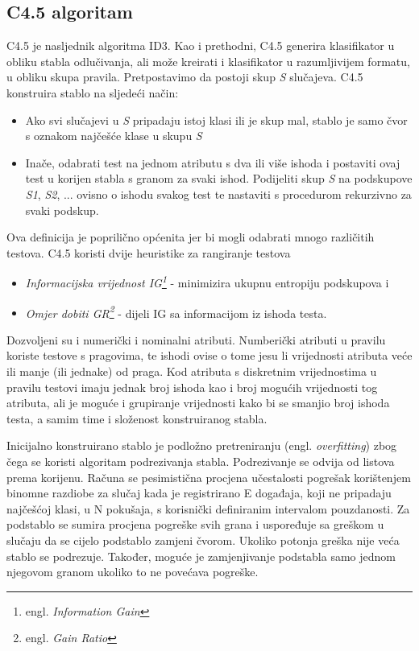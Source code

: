 \subsection{C4.5 algoritam}

C4.5 je nasljednik algoritma ID3. Kao i prethodni, C4.5 generira klasifikator u obliku stabla odlučivanja, ali može 
kreirati i klasifikator u razumljivijem formatu, u obliku skupa pravila. Pretpostavimo da postoji skup \textit{S} 
slučajeva. C4.5 konstruira stablo na sljedeći način:
\begin{itemize}
   \item Ako svi slučajevi u \textit{S} pripadaju istoj klasi ili je skup mal, stablo je samo čvor s oznakom najčešće klase u skupu \textit{S}
   \item Inače, odabrati test na jednom atributu s dva ili više ishoda i postaviti ovaj test u korijen stabla s granom za svaki ishod. Podijeliti skup \textit{S} na podskupove \textit{S1}, \textit{S2}, ... ovisno o ishodu svakog test te nastaviti s procedurom rekurzivno za svaki podskup.
\end{itemize}
Ova definicija je poprilično općenita jer bi mogli odabrati mnogo različitih testova. C4.5 koristi dvije heuristike za rangiranje testova
\begin{itemize}
   \item \textit{Informacijska vrijednost IG\footnote{engl. \textit{Information Gain}}}  - minimizira ukupnu entropiju podskupova i
   \item \textit{Omjer dobiti GR\footnote{engl. \textit{Gain Ratio}}} - dijeli IG sa informacijom iz ishoda testa.
\end{itemize}

Dozvoljeni su i numerički i nominalni atributi. Numberički atributi u pravilu koriste testove s pragovima, te ishodi
ovise o tome jesu li vrijednosti atributa veće ili manje (ili jednake) od praga. Kod atributa s diskretnim vrijednostima
u pravilu testovi imaju jednak broj ishoda kao i broj mogućih vrijednosti tog atributa, ali je moguće i grupiranje 
vrijednosti kako bi se smanjio broj ishoda testa, a samim time i složenost konstruiranog stabla.

Inicijalno konstruirano stablo je podložno pretreniranju (engl. \textit{overfitting}) zbog čega se koristi algoritam podrezivanja stabla. Podrezivanje se odvija od listova prema korijenu. Računa se pesimistična procjena učestalosti pogrešak korištenjem binomne razdiobe za slučaj kada je registrirano E događaja, koji ne pripadaju najčešćoj klasi, u N pokušaja, s korisnički definiranim intervalom pouzdanosti. Za podstablo se sumira procjena pogreške svih grana i uspoređuje sa greškom u slučaju da se cijelo podstablo zamjeni čvorom. Ukoliko potonja greška nije veća stablo se podrezuje. Također, moguće je zamjenjivanje podstabla samo jednom njegovom granom ukoliko to ne povećava pogreške\cite{Wu01}.

